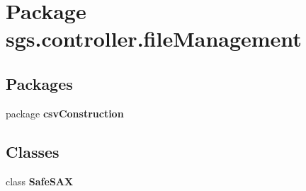 \section{Package sgs.\-controller.\-file\-Management}
\label{namespacesgs_1_1controller_1_1file_management}
\subsection*{Packages}
\begin{DoxyCompactItemize}
\item 
package {\bf csv\-Construction}
\end{DoxyCompactItemize}
\subsection*{Classes}
\begin{DoxyCompactItemize}
\item 
class {\bf Safe\-S\-A\-X}
\end{DoxyCompactItemize}
